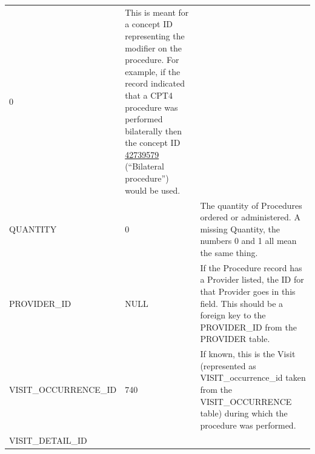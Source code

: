 \documentclass[11pt]{book}
\theoremstyle{definition}
\theoremstyle{definition}
\theoremstyle{definition}
\theoremstyle{remark}
\begin{document}
\begin{longtable}[]{@{}lll@{}}
\begin{minipage}[t]{0.15\columnwidth}
0\strut
\end{minipage} & \begin{minipage}[t]{0.49\columnwidth}\raggedright
This is meant for a concept ID representing the modifier on the procedure. For example, if the record indicated that a CPT4 procedure was performed bilaterally then the concept ID \href{http://athena.ohdsi.org/search-terms/terms/42739579}{42739579} (``Bilateral procedure'') would be used.\strut
\end{minipage}\tabularnewline
\begin{minipage}[t]{0.28\columnwidth}\raggedright
QUANTITY\strut
\end{minipage} & \begin{minipage}[t]{0.15\columnwidth}\raggedright
0\strut
\end{minipage} & \begin{minipage}[t]{0.49\columnwidth}\raggedright
The quantity of Procedures ordered or administered. A missing Quantity, the numbers 0 and 1 all mean the same thing.\strut
\end{minipage}\tabularnewline
\begin{minipage}[t]{0.28\columnwidth}\raggedright
PROVIDER\_ID\strut
\end{minipage} & \begin{minipage}[t]{0.15\columnwidth}\raggedright
NULL\strut
\end{minipage} & \begin{minipage}[t]{0.49\columnwidth}\raggedright
If the Procedure record has a Provider listed, the ID for that Provider goes in this field. This should be a foreign key to the PROVIDER\_ID from the PROVIDER table.\strut
\end{minipage}\tabularnewline
\begin{minipage}[t]{0.28\columnwidth}\raggedright
VISIT\_OCCURRENCE\_ID\strut
\end{minipage} & \begin{minipage}[t]{0.15\columnwidth}\raggedright
740\strut
\end{minipage} & \begin{minipage}[t]{0.49\columnwidth}\raggedright
If known, this is the Visit (represented as VISIT\_occurrence\_id taken from the VISIT\_OCCURRENCE table) during which the procedure was performed.\strut
\end{minipage}\tabularnewline
\begin{minipage}[t]{0.28\columnwidth}\raggedright
VISIT\_DETAIL\_ID\strut
\end{minipage} & \begin{minipage}[t]{0.15\columnwidth}\raggedright

\end{minipage}
\end{longtable}
\end{document}
